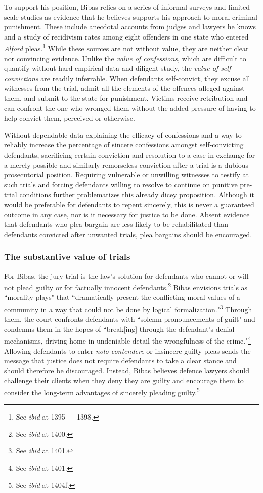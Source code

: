 To support his position, Bibas relies on a series of informal surveys and limited-scale studies as evidence that he believes supports his approach to moral criminal punishment. These include anecdotal accounts from judges and lawyers he knows and a study of recidivism rates among eight offenders in one state who entered \textit{Alford} pleas.\footnote{See \textit{ibid} at 1395 — 1398.} While these sources are not without value, they are neither clear nor convincing evidence. Unlike the \textit{value of confessions}, which are difficult to quantify without hard empirical data and diligent study, the \textit{value of self-convictions} are readily inferrable. When defendants self-convict, they excuse all witnesses from the trial, admit all the elements of the offences alleged against them, and submit to the state for punishment. Victims receive retribution and can confront the one who wronged them without the added pressure of having to help convict them, perceived or otherwise. 

Without dependable data explaining the efficacy of confessions and a way to reliably increase the percentage of sincere confessions amongst self-convicting defendants, sacrificing certain conviction and resolution to a case in exchange for a merely possible and similarly remorseless conviction after a trial is a dubious prosecutorial position. Requiring vulnerable or unwilling witnesses to testify at such trials and forcing defendants willing to resolve to continue on punitive pre-trial conditions further problematizes this already dicey proposition. Although it would be preferable for defendants to repent sincerely, this is never a guaranteed outcome in any case, nor is it necessary for justice to be done. Absent evidence that defendants who plea bargain are less likely to be rehabilitated than defendants convicted after unwanted trials, plea bargains should be encouraged.

\subsubsection{The substantive value of trials}

For Bibas, the jury trial is the law's solution for defendants who cannot or will not plead guilty or for factually innocent defendants.\footnote{See \textit{ibid} at 1400.} Bibas envisions trials as ``morality plays" that ``dramatically present the conflicting moral values of a community in a way that could not be done by logical formalization."\footnote{See \textit{ibid} at 1401.} Through them, the court confronts defendants with ``solemn pronouncements of guilt" and condemns them in the hopes of ``break[ing] through the defendant's denial mechanisms, driving home in undeniable detail the wrongfulness of the crime."\footnote{See \textit{ibid} at 1401.} Allowing defendants to enter \textit{nolo contendere} or insincere guilty pleas sends the message that justice does not require defendants to take a clear stance and should therefore be discouraged. Instead, Bibas believes defence lawyers should challenge their clients when they deny they are guilty and encourage them to consider the long-term advantages of sincerely pleading guilty.\footnote{See \textit{ibid} at 1404f.}

